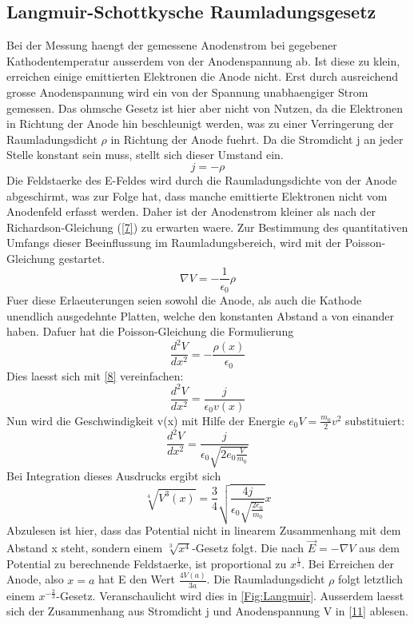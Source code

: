 \subsection{Langmuir-Schottkysche Raumladungsgesetz}
Bei der Messung haengt der gemessene Anodenstrom bei gegebener Kathodentemperatur ausserdem von der Anodenspannung ab. Ist diese zu klein, erreichen einige emittierten Elektronen die Anode nicht. Erst durch ausreichend grosse Anodenspannung wird ein von der Spannung unabhaengiger Strom gemessen. Das ohmsche Gesetz ist hier aber nicht von Nutzen, da die Elektronen in Richtung der Anode hin beschleunigt werden, was zu einer Verringerung der Raumladungsdicht $\rho$ in Richtung der Anode fuehrt. Da die Stromdicht j an jeder Stelle konstant sein muss, stellt sich dieser Umstand ein.
\begin{equation}
    j=-\rho \label{8}
\end{equation}
Die Feldstaerke des E-Feldes wird durch die Raumladungsdichte von der Anode abgeschirmt, was zur Folge hat, dass manche emittierte Elektronen nicht vom Anodenfeld erfasst werden. Daher ist der Anodenstrom kleiner als nach der Richardson-Gleichung (\ref{7}) zu erwarten waere. Zur Bestimmung des quantitativen Umfangs dieser Beeinflussung im Raumladungsbereich, wird mit der Poisson-Gleichung gestartet.
\begin{equation}
    \nabla V=-\frac{1}{\epsilon_0}\rho \nonumber
\end{equation}
Fuer diese Erlaeuterungen seien sowohl die Anode, als auch die Kathode unendlich ausgedehnte Platten, welche den konstanten Abstand a von einander haben. Dafuer hat die Poisson-Gleichung die Formulierung 
\begin{equation}
    \frac{d^2V}{dx^2}=-\frac{\rho(x)}{\epsilon_0}
\end{equation}
Dies laesst sich mit \ref{8} vereinfachen:
\begin{equation}
    \frac{d^2V}{dx^2}=\frac{j}{\epsilon_0v(x)}
\end{equation}
Nun wird die Geschwindigkeit v(x) mit Hilfe der Energie $e_0V=\frac{m_0}{2}v^2$ substituiert:
\begin{equation}
    \frac{d^2V}{dx^2}=\frac{j}{\epsilon_0\sqrt{2e_0\frac{V}{m_0}}}
\end{equation}
Bei Integration dieses Ausdrucks ergibt sich 
\begin{equation}
    \sqrt[4]{V^3(x)}=\frac{3}{4}\sqrt{\frac{4j}{\epsilon_0\sqrt{\frac{2e_0}{m_0}}}}x \label{11}
\end{equation}
Abzulesen ist hier, dass das Potential nicht in linearem Zusammenhang mit dem Abstand x steht, sondern einem $\sqrt[3]{x^4}$-Gesetz folgt. Die nach $\vec{E}=-\nabla V$ aus dem Potential zu berechnende Feldstaerke, ist proportional zu $x^{\frac{1}{3}}$. Bei Erreichen der Anode, also $x=a$ hat E den Wert $\frac{4V(a)}{3a}$. Die Raumladungsdicht $\rho$ folgt letztlich einem $x^{-\frac{2}{3}}$-Gesetz. Veranschaulicht wird dies in \ref{Fig:Langmuir}. Ausserdem laesst sich der Zusammenhang aus Stromdicht j und Anodenspannung V in \ref{11} ablesen.

